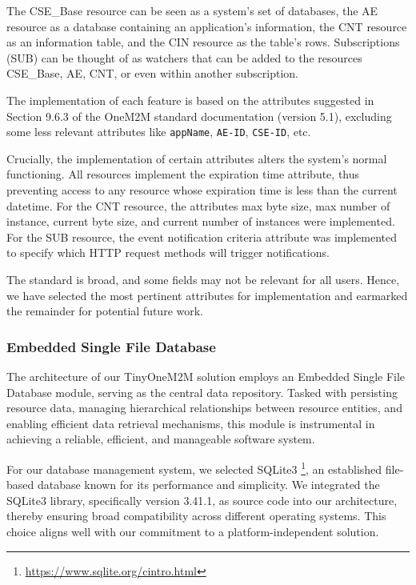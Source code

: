 \documentclass[a4paper,fleqn]{cas-dc}
\begin{document}
The CSE\_Base resource can be seen as a system's set of databases, the AE resource as a database containing an application's information, the CNT resource as an information table, and the CIN resource as the table's rows. Subscriptions (SUB) can be thought of as watchers that can be added to the resources CSE\_Base, AE, CNT, or even within another subscription.

The implementation of each feature is based on the attributes suggested in Section 9.6.3 of the OneM2M standard documentation (version 5.1), excluding some less relevant attributes like \texttt{appName}, \texttt{AE-ID}, \texttt{CSE-ID}, etc.

Crucially, the implementation of certain attributes alters the system's normal functioning. All resources implement the expiration time attribute, thus preventing access to any resource whose expiration time is less than the current datetime. For the CNT resource, the attributes max byte size, max number of instance, current byte size, and current number of instances were implemented. For the SUB resource, the event notification criteria attribute was implemented to specify which HTTP request methods will trigger notifications.

The standard is broad, and some fields may not be relevant for all users. Hence, we have selected the most pertinent attributes for implementation and earmarked the remainder for potential future work.

\subsubsection{Embedded Single File Database}

The architecture of our TinyOneM2M solution employs an Embedded Single File Database module, serving as the central data repository. Tasked with persisting resource data, managing hierarchical relationships between resource entities, and enabling efficient data retrieval mechanisms, this module is instrumental in achieving a reliable, efficient, and manageable software system.

For our database management system, we selected SQLite3 \footnote{\url{https://www.sqlite.org/cintro.html}}, an established file-based database known for its performance and simplicity. We integrated the SQLite3 library, specifically version 3.41.1, as source code into our architecture, thereby ensuring broad compatibility across different operating systems. This choice aligns well with our commitment to a platform-independent solution.
\end{document}
